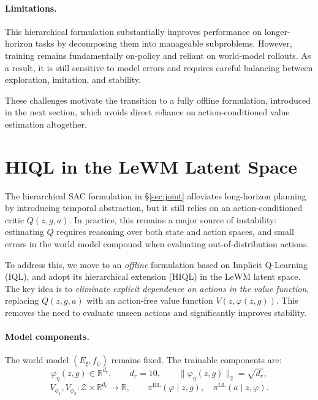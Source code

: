 \paragraph{Limitations.}
This hierarchical formulation substantially improves performance on
longer-horizon tasks by decomposing them into manageable subproblems.
However, training remains fundamentally on-policy and reliant on
world-model rollouts. As a result, it is still sensitive to model errors
and requires careful balancing between exploration, imitation, and
stability.

These challenges motivate the transition to a fully offline formulation,
introduced in the next section, which avoids direct reliance on
action-conditioned value estimation altogether.

\section{HIQL in the LeWM Latent Space}
\label{sec:hiql-lewm}

The hierarchical SAC formulation in \S\ref{sec:joint} alleviates
long-horizon planning by introducing temporal abstraction, but it still
relies on an action-conditioned critic $Q(z,g,a)$. In practice, this
remains a major source of instability: estimating $Q$ requires reasoning
over both state and action spaces, and small errors in the world model
compound when evaluating out-of-distribution actions.

To address this, we move to an \emph{offline} formulation based on
Implicit Q-Learning (IQL), and adopt its hierarchical extension (HIQL)
in the LeWM latent space. The key idea is to \emph{eliminate explicit
dependence on actions in the value function}, replacing $Q(z,g,a)$ with
an action-free value function $V(z, \varphi(z,g))$. This removes the need
to evaluate unseen actions and significantly improves stability.

\paragraph{Model components.}
The world model $(E_\xi, f_\psi)$ remains fixed. The trainable
components are:
\begin{equation}
\varphi_\eta(z,g) \in \mathbb{R}^{d_r}, \qquad d_r = 10,
\qquad \|\varphi_\eta(z,g)\|_2 = \sqrt{d_r},
\end{equation}
\begin{equation}
V_{\phi_1}, V_{\phi_2} : \mathcal{Z} \times \mathbb{R}^{d_r} \to \mathbb{R},
\qquad
\pi^{\mathrm{HL}}(\varphi \mid z,g), \quad
\pi^{\mathrm{LL}}(a \mid z,\varphi).
\end{equation}

